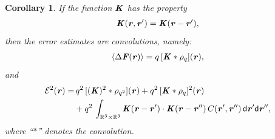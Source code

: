 \documentclass[aps,pre,preprint,unsortedaddress]{revtex4}
\renewcommand{\v}[1]{\textbf{\textit{#1}}}
\renewcommand{\d}[1]{\textsf{#1}}
\newtheorem{corollary}[theorem]{Corollary}
\begin{document}
\begin{corollary}\label{thm:tmp2}
  If the function $\v K$ has the property
  \begin{align}
    \label{eqn:cor-kernel}
    \v K(\v r,\v r') = \v K(\v r - \v r'),    
  \end{align}
  then the error estimates are convolutions, namely:
  \begin{align}\label{eqn:cor-meanf}
    \langle\Delta\v F(\v r)\rangle
    =q\, [\v K\ast\rho_q](\v r),
  \end{align}
  and 
  \begin{align}\nonumber
    \mathcal E^2 (\v r) 
    = &\,
    q^2\,[(\v K)^2\ast\rho_{q^2}] (\v r) + 
    q^2\,[\v K\ast\rho_{q}]^2 (\v r) \\\label{eqn:cor-error}
    &+
    q^2\,\int_{\mathbb R^3\times\mathbb R^3}
    \v K(\v r-\v r')\cdot
    \v K(\v r-\v r'')\,
    C(\v r', \v r'')\,
    \d d\v r'\d d\v r'',
  \end{align}
  where ``$\ast$'' denotes the convolution.
\end{corollary}
\end{document}
